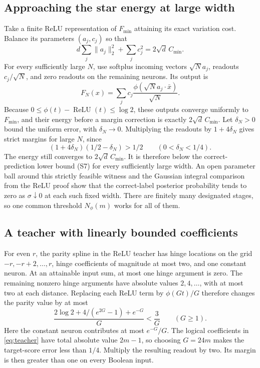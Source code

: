 \documentclass[11pt]{article}
\theoremstyle{remark}\newtheorem{remark}[theorem]{Remark}
\newcommand{\relu}{\operatorname{ReLU}}\newcommand{\Var}{\operatorname{Var}}
\begin{document}
\subsection{Approaching the star energy at large width}

Take a finite ReLU representation of $F_{\min}$ attaining its exact
variation cost. Balance its parameters $(a_j,c_j)$ so that
\[
 d\sum_j\|a_j\|_2^2+\sum_jc_j^2=2\sqrt d\,C_{\min}.
\]
For every sufficiently large $N$, use softplus incoming vectors
$\sqrt N a_j$, readouts $c_j/\sqrt N$, and zero readouts on the remaining
neurons. Its output is
\[
 F_N(x)=\sum_j c_j\frac{\phi(\sqrt N a_j\cdot\bar x)}{\sqrt N}.
\]
Because $0\le\phi(t)-\relu(t)\le\log2$, these outputs converge uniformly
to $F_{\min}$, and their energy before a margin correction is exactly
$2\sqrt d\,C_{\min}$. Let $\delta_N>0$ bound the uniform error, with
$\delta_N\to0$. Multiplying the readouts by $1+4\delta_N$ gives strict
margins for large $N$, since
\[
 (1+4\delta_N)(1/2-\delta_N)>1/2
 \qquad(0<\delta_N<1/4).
\]
The energy still converges to $2\sqrt d\,C_{\min}$. It is therefore below
the correct-prediction lower bound (S7) for every sufficiently large
width. An open parameter ball around this strictly feasible witness and
the Gaussian integral comparison from the ReLU proof show that the
correct-label posterior probability tends to zero as $\sigma\downarrow0$
at each such fixed width. There are finitely many designated stages, so
one common threshold $N_\phi(m)$ works for all of them.

\subsection{A teacher with linearly bounded coefficients}

For even $r$, the parity spline in the ReLU teacher has hinge locations
on the grid $-r,-r+2,\ldots,r$, hinge coefficients of magnitude at most
two, and one constant neuron. At an attainable input sum, at most one
hinge argument is zero. The remaining nonzero hinge arguments have
absolute values $2,4,\ldots$, with at most two at each distance.
Replacing each ReLU term by $\phi(Gt)/G$ therefore changes the parity
value by at most
\[
 \frac{2\log2+4/(e^{2G}-1)+e^{-G}}G<\frac3G
 \qquad(G\ge1).
\]
Here the constant neuron contributes at most $e^{-G}/G$.
The logical coefficients in \eqref{eq:teacher} have total absolute value
$2m-1$, so choosing $G=24m$ makes the target-score error less than $1/4$.
Multiply the resulting readout by two. Its margin is then greater than
one on every Boolean input.
\end{document}
